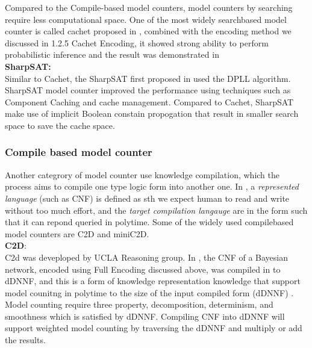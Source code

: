    \noindent  Compared to the Compile-based model counters, model counters by searching require less computational space. One of the most widely search\-based model counter is called cachet proposed in \cite{Cachet}, combined with the encoding method we discussed in 1.2.5 Cachet Encoding, it showed strong ability to perform probabilistic inference and the result was demonstrated in \cite{Sang:2005:PBI:1619332.1619409}\\
    
    \noindent \textbf{SharpSAT:}\\
    Similar to Cachet, the SharpSAT first proposed in \cite{Sharp-SAT2006} used the DPLL algorithm. SharpSAT model counter improved the performance using techniques such as Component Caching and cache management. Compared to Cachet, SharpSAT make use of implicit Boolean constain propogation that result in smaller search space to save the cache space.
    
    \subsubsection{Compile based model counter}
    Another categrory of model counter use knowledge compilation, which the process aims to compile one type logic form into another one.\cite{2008-literature-review} In \cite{2002language-map}, a \textit{represented language} (such as CNF) is defined as sth we expect human to read and write without too much effort, and the \textit{target compilation langauge} are in the form such that it can repond queried in poly\-time. Some of the widely used compile\-based model counters are C2D and miniC2D.\\
    
    \noindent \textbf{C2D}:\\
    C2d was deveploped by UCLA Reasoning group. In \cite{c2d}, the CNF of a Bayesian network, encoded using Full Encoding discussed above, was compiled in to d\-DNNF, and this is a form of knowledge representation knowledge that support model counitng in poly\-time to the size of the input compiled form (d\-DNNF) \cite{2002language-map}.\\
    
    \noindent Model counting require three property, decomposition, determinism, and smoothness which is satisfied by d\-DNNF. Compiling CNF into d\-DNNF will support weighted model counting by traversing the d\-DNNF and multiply or add the results.\\
    
